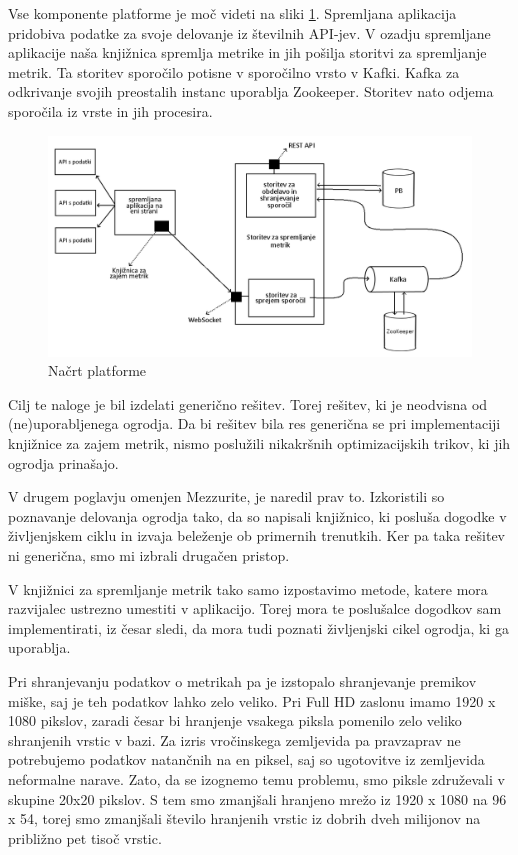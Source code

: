 \documentclass[a4paper, 12pt]{book}
\begin{document}
Vse komponente platforme je moč videti na sliki \ref{img:design}. Spremljana aplikacija pridobiva podatke za svoje delovanje iz številnih API-jev. V ozadju spremljane aplikacije naša knjižnica spremlja metrike in jih pošilja storitvi za spremljanje metrik. Ta storitev sporočilo potisne v sporočilno vrsto v Kafki. Kafka za odkrivanje svojih preostalih instanc uporablja Zookeeper. Storitev nato odjema sporočila iz vrste in jih procesira.

\begin{figure}[h]
	\begin{center}
		\includegraphics[width=1\textwidth]{design.png}
	\end{center}
	\caption{Načrt platforme}
	\label{img:design}
\end{figure}

Cilj te naloge je bil izdelati generično rešitev. Torej rešitev, ki je neodvisna od (ne)uporabljenega ogrodja. Da bi rešitev bila res generična se pri implementaciji knjižnice za zajem metrik, nismo poslužili nikakršnih optimizacijskih trikov, ki jih ogrodja prinašajo.

V drugem poglavju omenjen Mezzurite, je naredil prav to. Izkoristili so poznavanje delovanja ogrodja tako, da so napisali knjižnico, ki posluša dogodke v življenjskem ciklu in izvaja beleženje ob primernih trenutkih. Ker pa taka rešitev ni generična, smo mi izbrali drugačen pristop.

V knjižnici za spremljanje metrik tako samo izpostavimo metode, katere mora razvijalec ustrezno umestiti v aplikacijo. Torej mora te poslušalce dogodkov sam implementirati, iz česar sledi, da mora tudi poznati življenjski cikel ogrodja, ki ga uporablja.

Pri shranjevanju podatkov o metrikah pa je izstopalo shranjevanje premikov miške, saj je teh podatkov lahko zelo veliko. Pri Full HD zaslonu imamo 1920 x 1080 pikslov, zaradi česar bi hranjenje vsakega piksla pomenilo zelo veliko shranjenih vrstic v bazi. Za izris vročinskega zemljevida pa pravzaprav ne potrebujemo podatkov natančnih na en piksel, saj so ugotovitve iz zemljevida neformalne narave. Zato, da se izognemo temu problemu, smo piksle združevali v skupine 20x20 pikslov. S tem smo zmanjšali hranjeno mrežo iz 1920 x 1080 na 96 x 54, torej smo zmanjšali število hranjenih vrstic iz dobrih dveh milijonov na približno pet tisoč vrstic.
\end{document}
